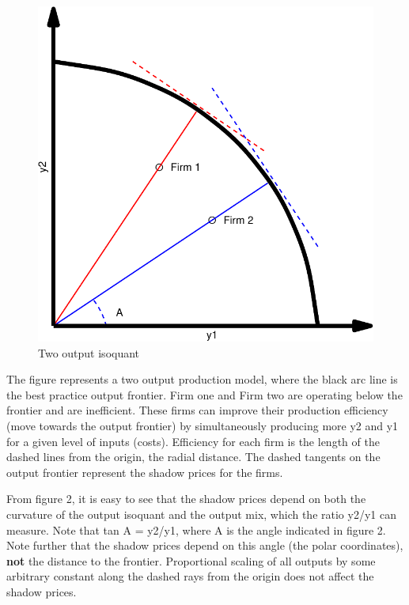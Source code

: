 \documentclass[
  10pt,
]{article}
\begin{document}
\begin{figure}[H]
\includegraphics{figures/paper-isoquant-1} \caption{ Two output isoquant}\label{fig:isoquant}
\end{figure}

\begin{footnotesize} 
The figure represents a two output production model, where the black arc line is the best practice output frontier. Firm one and Firm two are operating below the frontier and are inefficient. These firms can improve their production efficiency (move towards the output frontier) by simultaneously producing more y2 and y1 for a given level of inputs (costs). Efficiency for each firm is the length of the dashed lines from the origin, the radial distance.  The dashed tangents on the output frontier represent the shadow prices for the firms.
\end{footnotesize}

From figure 2, it is easy to see that the shadow prices depend on both
the curvature of the output isoquant and the output mix, which the ratio
y2/y1 can measure. Note that tan A = y2/y1, where A is the angle
indicated in figure 2. Note further that the shadow prices depend on
this angle (the polar coordinates), \textbf{not} the distance to the
frontier. Proportional scaling of all outputs by some arbitrary constant
along the dashed rays from the origin does not affect the shadow prices.
\end{document}
